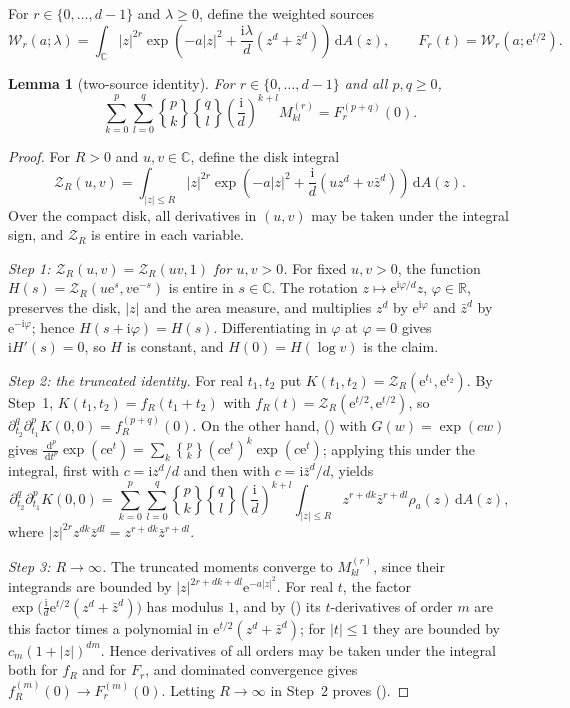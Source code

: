 \documentclass[twoside,10pt]{article}
\numberwithin{equation}{section}
\theoremstyle{slbody}
\newtheorem{lemma}[theorem]{Lemma}
\theoremstyle{remark}
\newcommand{\C}{\mathbb C}
\newcommand{\dd}{\,\mathrm d}
\newcommand{\ii}{\mathrm i}
\newcommand{\e}{\mathrm e}
\newcommand{\stir}[2]{\genfrac\{\}{0pt}{}{#1}{#2}}
\renewcommand{\eqref}[1]{%
  \textup{{\normalfont(\oldstylenums{\ref{#1}}}\normalfont)}}
\begin{document}
For \(r\in\{0,\ldots,d-1\}\) and \(\lambda\geq0\), define the weighted
sources
\[
\mathcal W_r(a;\lambda)
=\int_{\C}|z|^{2r}
\exp\left(-a|z|^2+\frac{\ii\lambda}{d}(z^d+\bar z^d)\right)
\dd A(z),
\qquad
F_r(t)=\mathcal W_r(a;\e^{t/2}).
\]

\begin{lemma}[two-source identity]
\label{lem:source-moments}
For \(r\in\{0,\ldots,d-1\}\) and all \(p,q\geq0\),
\begin{equation}
\sum_{k=0}^p\sum_{l=0}^q\stir pk\stir ql
\left(\frac{\ii}{d}\right)^{k+l}M_{kl}^{(r)}
=F_r^{(p+q)}(0).
\label{eq:source-moments}
\end{equation}
\end{lemma}

\begin{proof}
For \(R>0\) and \(u,v\in\C\), define the disk integral
\[
\mathcal Z_R(u,v)
=\int_{|z|\leq R}|z|^{2r}
\exp\left(-a|z|^2+\frac{\ii}{d}(uz^d+v\bar z^d)\right)\dd A(z).
\]
Over the compact disk, all derivatives in \((u,v)\) may be taken under
the integral sign, and \(\mathcal Z_R\) is entire in each variable.

\emph{Step 1: \(\mathcal Z_R(u,v)=\mathcal Z_R(uv,1)\) for \(u,v>0\).}
For fixed \(u,v>0\), the function
\(H(s)=\mathcal Z_R(u\e^s,v\e^{-s})\) is entire in \(s\in\C\).  The
rotation \(z\mapsto\e^{\ii\varphi/d}z\), \(\varphi\in\mathbb R\),
preserves the disk, \(|z|\) and the area measure, and multiplies \(z^d\)
by \(\e^{\ii\varphi}\) and \(\bar z^d\) by \(\e^{-\ii\varphi}\); hence
\(H(s+\ii\varphi)=H(s)\).  Differentiating in \(\varphi\) at
\(\varphi=0\) gives \(\ii H'(s)=0\), so \(H\) is constant, and
\(H(0)=H(\log v)\) is the claim.

\emph{Step 2: the truncated identity.}  For real \(t_1,t_2\) put
\(K(t_1,t_2)=\mathcal Z_R(\e^{t_1},\e^{t_2})\).  By Step~1,
\(K(t_1,t_2)=f_R(t_1+t_2)\) with \(f_R(t)=\mathcal Z_R(\e^{t/2},\e^{t/2})\),
so \(\partial_{t_2}^q\partial_{t_1}^pK(0,0)=f_R^{(p+q)}(0)\).  On the other
hand, \eqref{eq:stirling} with \(G(w)=\exp(cw)\) gives
\(\frac{\dd^p}{\dd t^p}\exp(c\e^t)=\sum_k\stir pk(c\e^t)^k\exp(c\e^t)\);
applying this under the integral, first with \(c=\ii z^d/d\) and then
with \(c=\ii\bar z^d/d\), yields
\[
\partial_{t_2}^q\partial_{t_1}^pK(0,0)
=\sum_{k=0}^p\sum_{l=0}^q\stir pk\stir ql
\left(\frac{\ii}{d}\right)^{k+l}
\int_{|z|\leq R}z^{r+dk}\bar z^{r+dl}\rho_a(z)\dd A(z),
\]
where \(|z|^{2r}z^{dk}\bar z^{dl}=z^{r+dk}\bar z^{r+dl}\).

\emph{Step 3: \(R\to\infty\).}  The truncated moments converge to
\(M_{kl}^{(r)}\), since their integrands are bounded by
\(|z|^{2r+dk+dl}\e^{-a|z|^2}\).  For real \(t\), the factor
\(\exp\bigl(\frac{\ii}{d}\e^{t/2}(z^d+\bar z^d)\bigr)\) has modulus \(1\),
and by \eqref{eq:stirling} its \(t\)-derivatives of order \(m\) are this
factor times a polynomial in \(\e^{t/2}(z^d+\bar z^d)\); for \(|t|\leq1\)
they are bounded by \(c_m(1+|z|)^{dm}\).  Hence derivatives of all
orders may be taken under the integral both for \(f_R\) and for
\(F_r\), and dominated convergence gives
\(f_R^{(m)}(0)\to F_r^{(m)}(0)\).  Letting \(R\to\infty\) in Step~2
proves \eqref{eq:source-moments}.
\end{proof}
\end{document}
